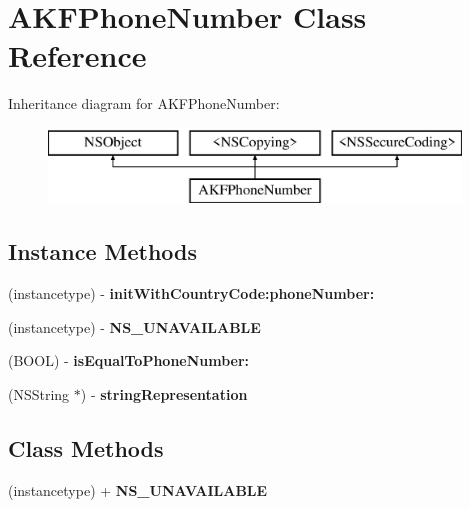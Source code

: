 \hypertarget{interface_a_k_f_phone_number}{}\section{A\+K\+F\+Phone\+Number Class Reference}
\label{interface_a_k_f_phone_number}
Inheritance diagram for A\+K\+F\+Phone\+Number\+:\begin{figure}[H]
\begin{center}
\leavevmode
\includegraphics[height=2.000000cm]{interface_a_k_f_phone_number}
\end{center}
\end{figure}
\subsection*{Instance Methods}
\begin{DoxyCompactItemize}
\item 
\hypertarget{interface_a_k_f_phone_number_ad6e3d0b16c817df9692a8859af56b6fa}{}(instancetype) -\/ {\bfseries init\+With\+Country\+Code\+:phone\+Number\+:}\label{interface_a_k_f_phone_number_ad6e3d0b16c817df9692a8859af56b6fa}

\item 
\hypertarget{interface_a_k_f_phone_number_aac4e865d72eebd097172d1c6fc5490f2}{}(instancetype) -\/ {\bfseries N\+S\+\_\+\+U\+N\+A\+V\+A\+I\+L\+A\+B\+L\+E}\label{interface_a_k_f_phone_number_aac4e865d72eebd097172d1c6fc5490f2}

\item 
\hypertarget{interface_a_k_f_phone_number_a22a7532885534ec1a3d252124651dce7}{}(B\+O\+O\+L) -\/ {\bfseries is\+Equal\+To\+Phone\+Number\+:}\label{interface_a_k_f_phone_number_a22a7532885534ec1a3d252124651dce7}

\item 
\hypertarget{interface_a_k_f_phone_number_aff29f731659db684458bba6ba9ee7d89}{}(N\+S\+String $\ast$) -\/ {\bfseries string\+Representation}\label{interface_a_k_f_phone_number_aff29f731659db684458bba6ba9ee7d89}

\end{DoxyCompactItemize}
\subsection*{Class Methods}
\begin{DoxyCompactItemize}
\item 
\hypertarget{interface_a_k_f_phone_number_aac4e865d72eebd097172d1c6fc5490f2}{}(instancetype) + {\bfseries N\+S\+\_\+\+U\+N\+A\+V\+A\+I\+L\+A\+B\+L\+E}\label{interface_a_k_f_phone_number_aac4e865d72eebd097172d1c6fc5490f2}

\end{DoxyCompactItemize}
